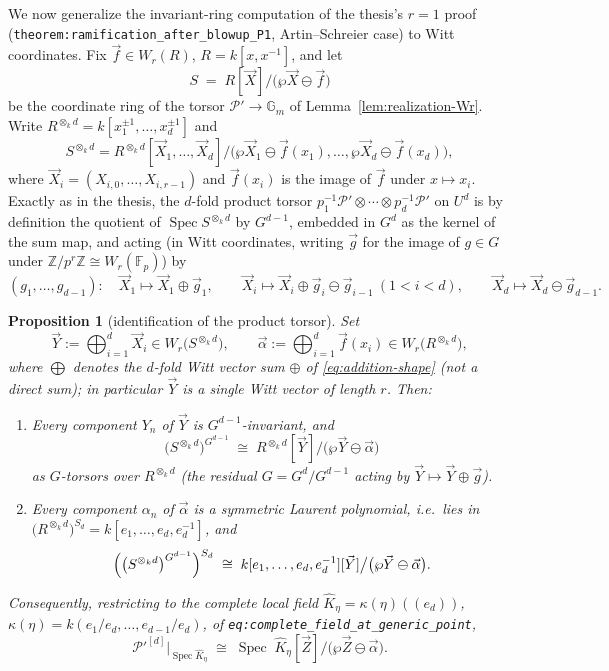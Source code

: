 \documentclass[11pt]{article}
\newcommand{\cP}{\mathcal{P}}
\newcommand{\Z}{\mathbb{Z}}
\newcommand{\F}{\mathbb{F}}
\newcommand{\bG}{\mathbb{G}}
\DeclareMathOperator{\Spec}{Spec}
\newcommand{\AS}{\wp}
\newcommand{\vf}{\vec f}
\newcommand{\vX}{\vec X}
\newcommand{\vY}{\vec Y}
\newcommand{\vZ}{\vec Z}
\theoremstyle{plain}
\newtheorem{prop}[theorem]{Proposition}
\theoremstyle{definition}
\begin{document}
We now generalize the invariant-ring computation of the thesis's $r=1$ proof
(\texttt{theorem:ramification\_after\_blowup\_P1}, Artin--Schreier case) to Witt
coordinates. Fix $\vf\in W_r(R)$, $R=k[x,x^{-1}]$, and let
\[
S \;=\; R[\vX]\big/\bigl(\AS\vX\ominus\vf\bigr)
\]
be the coordinate ring of the torsor $\cP'\to\bG_m$ of
Lemma~\ref{lem:realization-Wr}. Write $R^{\otimes_kd}=k[x_1^{\pm1},\dots,x_d^{\pm1}]$
and
\[
S^{\otimes_kd}
= R^{\otimes_kd}[\vX_1,\dots,\vX_d]\big/\bigl(\AS\vX_1\ominus\vf(x_1),\dots,
\AS\vX_d\ominus\vf(x_d)\bigr),
\]
where $\vX_i=(X_{i,0},\dots,X_{i,r-1})$ and $\vf(x_i)$ is the image of $\vf$ under
$x\mapsto x_i$. Exactly as in the thesis, the $d$-fold product torsor
$p_1^{-1}\cP'\otimes\cdots\otimes p_d^{-1}\cP'$ on $U^d$ is by definition the quotient of
$\Spec S^{\otimes_kd}$ by $G^{d-1}$, embedded in $G^d$ as the kernel of the sum map, and
acting (in Witt coordinates, writing $\vec g$ for the image of $g\in G$ under
$\Z/p^r\Z\cong W_r(\F_p)$) by
\[
(g_1,\dots,g_{d-1})\colon\quad
\vX_1\mapsto\vX_1\oplus\vec g_1,\qquad
\vX_i\mapsto\vX_i\oplus\vec g_i\ominus\vec g_{i-1}\ (1<i<d),\qquad
\vX_d\mapsto\vX_d\ominus\vec g_{d-1}.
\]

\begin{prop}[identification of the product torsor]\label{prop:cover-identification}
Set
\[
\vY:=\bigoplus_{i=1}^d\vX_i\in W_r\bigl(S^{\otimes_kd}\bigr),
\qquad
\vec\alpha:=\bigoplus_{i=1}^d\vf(x_i)\in W_r\bigl(R^{\otimes_kd}\bigr),
\]
where $\bigoplus$ denotes the $d$-fold Witt vector sum $\oplus$ of
\eqref{eq:addition-shape} (not a direct sum); in particular $\vY$ is a single Witt
vector of length $r$. Then:
\begin{enumerate}
  \item \label{it:inv} Every component $Y_n$ of $\vY$ is $G^{d-1}$-invariant, and
        \[
        \bigl(S^{\otimes_kd}\bigr)^{G^{d-1}}
        \;\cong\;
        R^{\otimes_kd}[\vY]\big/\bigl(\AS\vY\ominus\vec\alpha\bigr)
        \]
        as $G$-torsors over $R^{\otimes_kd}$ (the residual $G=G^d/G^{d-1}$ acting by
        $\vY\mapsto\vY\oplus\vec g$).
  \item \label{it:symm} Every component $\alpha_n$ of $\vec\alpha$ is a symmetric Laurent
        polynomial, i.e.\ lies in
        $\bigl(R^{\otimes_kd}\bigr)^{S_d}=k[e_1,\dots,e_d,e_d^{-1}]$, and
        \[
        \Bigl(\bigl(S^{\otimes_kd}\bigr)^{G^{d-1}}\Bigr)^{S_d}
        \;\cong\;
        k[e_1,\dots,e_d,e_d^{-1}][\vY]\big/\bigl(\AS\vY\ominus\vec\alpha\bigr).
        \]
\end{enumerate}
Consequently, restricting to the complete local field
$\widehat K_\eta=\kappa(\eta)((e_d))$, $\kappa(\eta)=k(e_1/e_d,\dots,e_{d-1}/e_d)$, of
\textup{\texttt{eq:complete\_field\_at\_generic\_point}},
\[
\cP'^{[d]}\big|_{\Spec\widehat K_\eta}
\;\cong\;
\Spec\;\widehat K_\eta[\vZ]\big/\bigl(\AS\vZ\ominus\vec\alpha\bigr).
\]
\end{prop}
\end{document}
